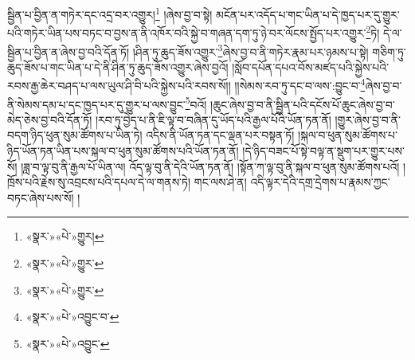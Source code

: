 སྦྱིན་པ་བྱིན་ན་གཏེར་དང་འདྲ་བར་འགྱུར།\footnote{«སྣར་»«པེ་»གྱུར།} །ཞེས་བྱ་བ་སྟེ། མངོན་པར་འདོད་པ་གང་ཡིན་པ་དེ་ཁྱད་པར་དུ་གྱུར་པའི་གཏེར་ཡིན་པས་བཏང་བ་བྱས་ན་ནི་འཁོར་བའི་སྐྱེ་བ་གཞན་དག་ཏུ་ཉེ་བར་ལོངས་སྤྱོད་པར་འགྱུར་\footnote{«སྣར་»«པེ་»གྱུར་}ཏེ། དེ་ལ་སྦྱིན་པ་བྱིན་ན་ཞེས་བྱ་བའི་དོན་ཏོ། །ཤིན་ཏུ་ཆུད་ཟོས་འགྱུར་\footnote{«སྣར་»«པེ་»གྱུར་}ཞེས་བྱ་བ་ནི་གཏེར་རྣམ་པར་ཉམས་པ་སྟེ། གཅིག་ཏུ་ཆུད་ཟོས་པ་གང་ཡིན་པ་དེ་ནི་ཤིན་ཏུ་ཆུད་ཟོས་འགྱུར་ཞེས་བྱའོ། །སློབ་དཔོན་དཔའ་བོས་མཛད་པའི་སྐྱེས་པའི་རབས་རྒྱ་ཆེར་བཤད་པ་ལས་ཡུལ་ཤི་བི་པའི་སྐྱེས་པའི་རབས་སོ།། །།སེམས་རབ་ཏུ་དང་བ་ལས་:བྱུང་བ་\footnote{«སྣར་»«པེ་»འབྱུང་བ་}ཞེས་བྱ་བ་ནི་སེམས་དམ་པ་དང་ཁྱད་པར་དུ་གྱུར་པ་ལས་བྱུང་\footnote{«སྣར་»«པེ་»འབྱུང་}བའོ། །ཆུང་ཞེས་བྱ་བ་ནི་སྦྱིན་པའི་དངོས་པོ་ཆུང་ཞེས་བྱ་བ་མེད་ཅེས་བྱ་བའི་དོན་ཏོ། །རབ་ཏུ་བྱེད་པ་ནི་ཇི་ལྟ་བ་བཞིན་དུ་ཡོད་པའི་རྒྱལ་པོའི་ཡོན་ཏན་ནོ། །གྱུར་ཞེས་བྱ་བ་ནི་བདག་ཉིད་ཕུན་སུམ་ཚོགས་པ་ཡིན་ཏེ། འདིས་ནི་ཡོན་ཏན་དང་ལྡན་པར་བསྟན་ཏོ། །སྐལ་བ་ཕུན་སུམ་ཚོགས་པ་ཉིད་ཡོན་ཏན་ཡིན་པས་སྐལ་བ་ཕུན་སུམ་ཚོགས་པའི་ཡོན་ཏན་ནོ། །དེ་ཉིད་བཟང་པོ་སྟེ་བལྟ་ན་སྡུག་པར་གྱུར་པས་སོ། །ཟླ་བ་ལྟ་བུ་ནི་རྒྱལ་པོ་ཡིན་ལ། འོད་ལྟ་བུ་ནི་དེའི་ཡོན་ཏན་ནོ། །སྟོན་ཀ་ལྟ་བུ་ནི་སྐལ་བ་ཕུན་སུམ་ཚོགས་པའོ། །ཁྲོས་པའི་རྗེས་སུ་འབྲངས་པའི་དཔལ་དེ་ལ་གནས་ཏེ། གང་ལས་ཤེ་ན། འདི་ལྟར་དེའི་དགྲ་དྲེགས་པ་རྣམས་ཀྱང་བཏང་ཞེས་པས་སོ། །
